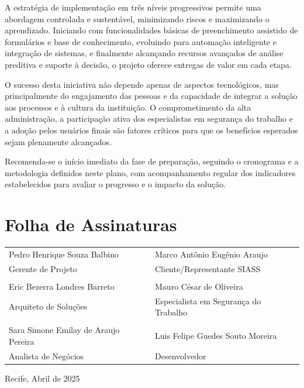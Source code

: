 \documentclass[12pt,a4paper]{article}
\begin{document}
A estratégia de implementação em três níveis progressivos permite uma abordagem controlada e sustentável, minimizando riscos e maximizando o aprendizado. Iniciando com funcionalidades básicas de preenchimento assistido de formulários e base de conhecimento, evoluindo para automação inteligente e integração de sistemas, e finalmente alcançando recursos avançados de análise preditiva e suporte à decisão, o projeto oferece entregas de valor em cada etapa.

O sucesso desta iniciativa não depende apenas de aspectos tecnológicos, mas principalmente do engajamento das pessoas e da capacidade de integrar a solução aos processos e à cultura da instituição. O comprometimento da alta administração, a participação ativa dos especialistas em segurança do trabalho e a adoção pelos usuários finais são fatores críticos para que os benefícios esperados sejam plenamente alcançados.

Recomenda-se o início imediato da fase de preparação, seguindo o cronograma e a metodologia definidos neste plano, com acompanhamento regular dos indicadores estabelecidos para avaliar o progresso e o impacto da solução.

\clearpage
\thispagestyle{empty}
\section*{Folha de Assinaturas}

\vspace{2cm}

\begin{center}
\begin{tabular}{p{7cm}p{7cm}}
\hline
Pedro Henrique Souza Balbino & Marco Antônio Eugênio Araujo \\
Gerente de Projeto & Cliente/Representante SIASS \\
\hline
\\[1cm]
\hline
Eric Bezerra Londres Barreto & Mauro César de Oliveira \\
Arquiteto de Soluções & Especialista em Segurança do Trabalho \\
\hline
\\[1cm]
\hline
Sara Simone Emilay de Araujo Pereira & Luis Felipe Guedes Souto Moreira \\
Analista de Negócios & Desenvolvedor \\
\hline
\end{tabular}
\end{center}

\vfill
\begin{center}
\large
Recife, Abril de 2025
\end{center}
\end{document}
